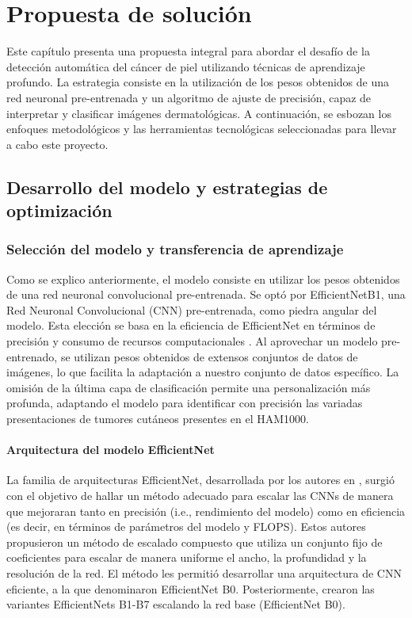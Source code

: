 \chapter{Propuesta de solución}\label{chapter:proposal}

Este capítulo presenta una propuesta integral para abordar el desafío de la detección automática del cáncer de piel utilizando técnicas de aprendizaje profundo. La estrategia consiste en la utilización  de los pesos obtenidos de una red neuronal pre-entrenada y un algoritmo de ajuste de precisión, capaz de interpretar y clasificar imágenes dermatológicas. A continuación, se esbozan los enfoques metodológicos y las herramientas tecnológicas seleccionadas para llevar a cabo este proyecto.

\section{Desarrollo del modelo y estrategias de optimización}\label{sec:method}

\subsection{Selección del modelo y transferencia de aprendizaje}

Como se explico anteriormente, el modelo consiste en utilizar los pesos obtenidos de una red neuronal convolucional pre-entrenada. Se optó por EfficientNetB1, una Red Neuronal Convolucional (CNN) pre-entrenada, como piedra angular del modelo. Esta elección se basa en la eficiencia de EfficientNet en términos de precisión y consumo de recursos computacionales . Al aprovechar un modelo pre-entrenado, se utilizan pesos obtenidos de extensos conjuntos de datos de imágenes, lo que facilita la adaptación a nuestro conjunto de datos específico. La omisión de la última capa de clasificación permite una personalización más profunda, adaptando el modelo para identificar con precisión las variadas presentaciones de tumores cutáneos presentes en el HAM1000.

\subsubsection{Arquitectura del modelo EfficientNet}
   
   La familia de arquitecturas EfficientNet, desarrollada por los autores en , surgió con el objetivo de hallar un método adecuado para escalar las CNNs de manera que mejoraran tanto en precisión (i.e., rendimiento del modelo) como en eficiencia (es decir, en términos de parámetros del modelo y FLOPS). Estos autores propusieron un método de escalado compuesto que utiliza un conjunto fijo de coeficientes para escalar de manera uniforme el ancho, la profundidad y la resolución de la red. El método les permitió desarrollar una arquitectura de CNN eficiente, a la que denominaron EfficientNet B0. Posteriormente, crearon las variantes EfficientNets B1-B7 escalando la red base (EfficientNet B0).
   
